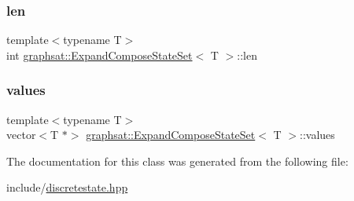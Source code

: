 \subsubsection{\texorpdfstring{len}{len}}
{\footnotesize\ttfamily template$<$typename T$>$ \\
int \mbox{\hyperlink{classgraphsat_1_1_expand_compose_state_set}{graphsat\+::\+Expand\+Compose\+State\+Set}}$<$ T $>$\+::len\hspace{0.3cm}{\ttfamily [private]}}

\mbox{\label{classgraphsat_1_1_expand_compose_state_set_ad7e80585398422e131484fb801cfdaf1}} 
\subsubsection{\texorpdfstring{values}{values}}
{\footnotesize\ttfamily template$<$typename T$>$ \\
vector$<$T $\ast$$>$ \mbox{\hyperlink{classgraphsat_1_1_expand_compose_state_set}{graphsat\+::\+Expand\+Compose\+State\+Set}}$<$ T $>$\+::values\hspace{0.3cm}{\ttfamily [private]}}



The documentation for this class was generated from the following file\+:\begin{DoxyCompactItemize}
\item 
include/\mbox{\hyperlink{discretestate_8hpp}{discretestate.\+hpp}}\end{DoxyCompactItemize}
